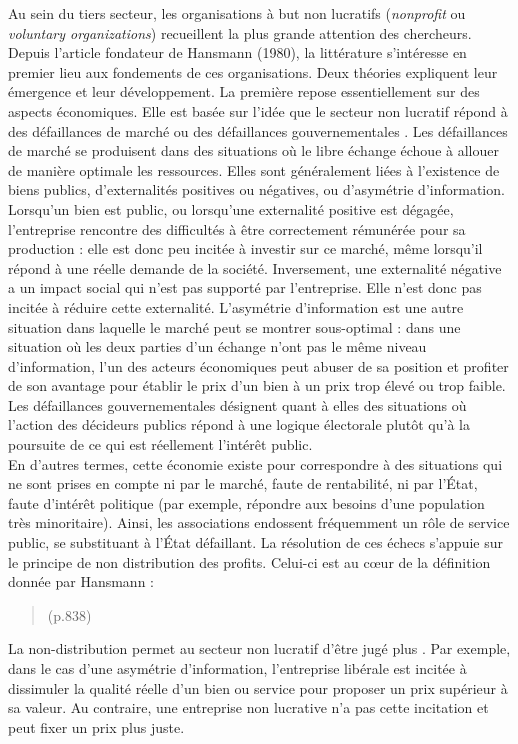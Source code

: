             Au sein du tiers secteur, les organisations à but non lucratifs (\textit{nonprofit} ou \textit{voluntary organizations}) recueillent la plus grande attention des chercheurs. Depuis l'article fondateur de Hansmann (1980), la littérature s'intéresse en premier lieu aux fondements de ces organisations. Deux théories expliquent leur émergence et leur développement. La première repose essentiellement sur des aspects économiques. Elle est basée sur l'idée que le secteur non lucratif répond à des défaillances de marché \parencite{hansmann1980role} ou des défaillances gouvernementales \parencite{weisbrod1994nonprofit}. Les défaillances de marché se produisent dans des situations où le libre échange échoue à allouer de manière optimale les ressources. Elles sont généralement liées à l'existence de biens publics,  d'externalités positives ou négatives, ou d'asymétrie d'information. Lorsqu'un bien est public, ou lorsqu'une externalité positive est dégagée, l'entreprise rencontre des difficultés à être correctement rémunérée pour sa production : elle est donc peu incitée à investir sur ce marché, même lorsqu'il répond à une réelle demande de la société. Inversement, une externalité négative a un impact social qui n'est pas supporté par l'entreprise. Elle n'est donc pas incitée à réduire cette externalité. L'asymétrie d'information est une autre situation dans laquelle le marché peut se montrer sous-optimal : dans une situation où les deux parties d'un échange n'ont pas le même niveau d'information, l'un des acteurs économiques peut abuser de sa position et profiter de son avantage pour établir le prix d'un bien à un prix trop élevé ou trop faible. Les défaillances gouvernementales désignent quant à elles des situations où l'action des décideurs publics répond à une logique électorale plutôt qu'à la poursuite de ce qui est réellement l'intérêt public. \\

            En d’autres termes, cette économie existe pour correspondre à des situations qui ne sont prises en compte ni par le marché, faute de rentabilité, ni par l’État, faute d’intérêt politique (par exemple, répondre aux besoins d’une population très minoritaire). Ainsi, les associations endossent fréquemment un rôle de service public, se substituant à l’État défaillant. La résolution de ces échecs s’appuie sur le principe de non distribution des profits. Celui-ci est au cœur de la définition donnée par Hansmann :
            \begin{quotation}
             (p.838)
            \end{quotation}
             La non-distribution permet  au secteur non lucratif d’être jugé plus . Par exemple, dans le cas d'une asymétrie d’information, l'entreprise libérale est incitée à dissimuler la qualité réelle d'un bien ou service pour proposer un prix supérieur à sa valeur. Au contraire, une entreprise non lucrative n’a pas cette incitation et peut fixer un prix plus juste. \\

